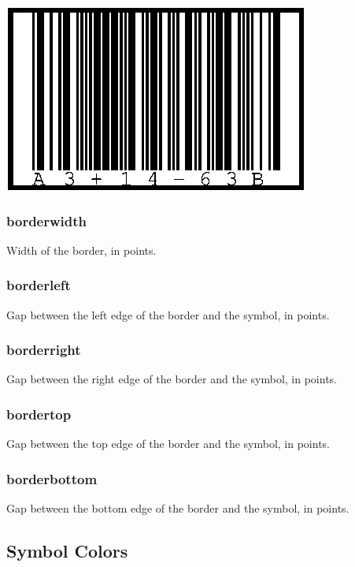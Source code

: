 \includegraphics{images/optborder.eps}

\hypertarget{borderwidth}{%
\subsubsection{borderwidth}\label{borderwidth}}

Width of the border, in points.

\hypertarget{borderleft}{%
\subsubsection{borderleft}\label{borderleft}}

Gap between the left edge of the border and the symbol, in points.

\hypertarget{borderright}{%
\subsubsection{borderright}\label{borderright}}

Gap between the right edge of the border and the symbol, in points.

\hypertarget{bordertop}{%
\subsubsection{bordertop}\label{bordertop}}

Gap between the top edge of the border and the symbol, in points.

\hypertarget{borderbottom}{%
\subsubsection{borderbottom}\label{borderbottom}}

Gap between the bottom edge of the border and the symbol, in points.

\hypertarget{symbol-colors}{%
\subsection{Symbol Colors}\label{symbol-colors}}

